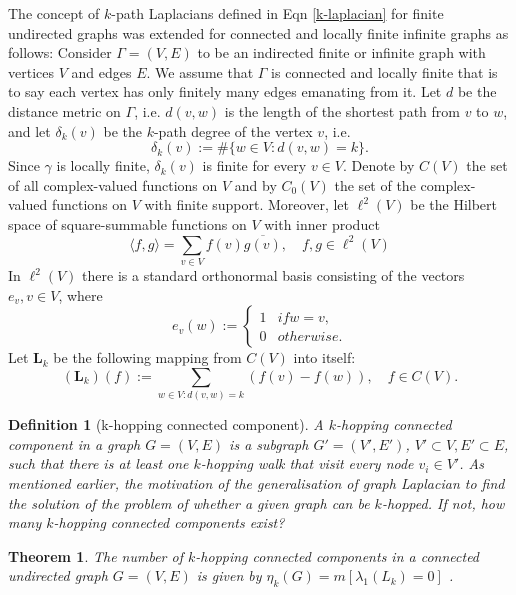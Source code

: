 \documentclass[10pt,a4paper]{article}
\newtheorem{thm}{Theorem}
\newtheorem{defn}{Definition}
\begin{document}
    	    
    	    
    	    The concept of $k$-path Laplacians defined in Eqn \ref{k-laplacian} for finite undirected graphs was extended for connected and locally finite infinite graphs as follows:
    	    Consider $\Gamma = (V,E)$ to be an indirected finite or infinite graph with vertices $V$ and edges $E$. We assume that $\Gamma$ is connected and locally finite that is to say each vertex has only finitely many edges emanating from it. Let $d$ be the distance metric on $\Gamma$, i.e. $d(v,w)$ is the length of the shortest path from $v$ to $w$, and let $\delta_{k}(v)$ be the $k$-path degree of the vertex $v$, i.e.
    	    \begin{equation}
    	    \delta_{k}(v) := \#\{w \in V : d(v,w) = k\}.
    	    \end{equation}
    	    Since $\gamma$ is locally finite, $\delta_{k}(v)$ is finite for every $v \in V$. Denote by $C(V)$ the set of all complex-valued functions on $V$ and by $C_{0}(V)$ the set of the complex-valued functions on $V$ with finite support. Moreover, let $\ell^2(V)$ be the Hilbert space of square-summable functions on $V$ with inner product
    	    \begin{equation}
    	    \langle f,g\rangle = \sum_{v\in V} f(v) \overline{g(v)}, \quad f,g \in \ell^2(V) 
    	    \end{equation}
    	    In $\ell^2(V)$ there is a standard orthonormal basis consisting of the vectors $e_v, v\in V$, where
    	    \begin{equation}
    	    e_v(w) :=  \begin{cases*}
    	    1 & if  w = v,  \\
    	    0 & otherwise.
    	    \end{cases*}
    	    \end{equation}
    	    Let $\mathbf{L}_{k}$ be the following mapping from $C(V)$ into itself:
    	    \begin{equation}
    	    (\mathbf{L}_{k}) (f) := \sum_{w\in V: d(v,w)=k} (f(v) -f(w)), \quad f \in C(V).
    	    \label{infinite-dif}
    	    \end{equation}
    	    
    	    
    	    \begin{defn}[k-hopping connected component]
    	    	A $k$-hopping connected component in a graph $G=(V,E)$ is a subgraph $G' = (V',E')$, $V'\subset V,E' \subset E$, such that there is at least one $k$-hopping walk that visit every node $v_i \in V'$.
    	    	As mentioned earlier, the motivation of the generalisation of graph Laplacian to find the solution of the problem of whether a given graph can be $k$-hopped. If not, how many $k$-hopping connected components exist?\\
    	    \end{defn}
    	    \begin{thm}
    	    	The number of $k$-hopping connected components in a connected undirected graph $G=(V,E)$ is given by $\eta_k(G) = m[\lambda_1(L_k)=0]$ \citep{estrada2012path}.\\
    	    \end{thm}
        
\end{document}
